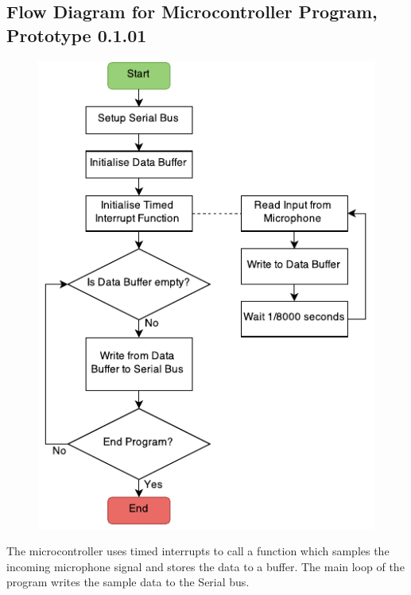 \subsection{Flow Diagram for Microcontroller Program, Prototype 0.1.01}
\label{mcflow}
\begin{figure}[H]
\centering
\includegraphics[scale = 1]{Images/mc0101}
\end{figure}
The microcontroller uses timed interrupts to call a function which samples the incoming microphone signal and stores the data to a buffer. The main loop of the program writes the sample data to the Serial bus. 


\newpage
